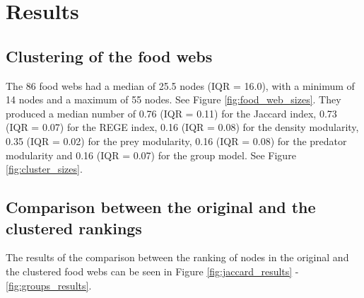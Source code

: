 \section*{Results}

	\subsection*{Clustering of the food webs}

		The 86 food webs had a median of 25.5 nodes (IQR = 16.0), with a minimum of 14 nodes and a maximum of 55 nodes. See Figure \ref{fig:food_web_sizes}. They produced a median number of 0.76 (IQR = 0.11) for the Jaccard index, 0.73 (IQR = 0.07) for the REGE index, 0.16 (IQR = 0.08) for the density modularity, 0.35 (IQR = 0.02) for the prey modularity, 0.16 (IQR = 0.08) for the predator modularity and 0.16 (IQR = 0.07) for the group model. See Figure \ref{fig:cluster_sizes}.

	\subsection*{Comparison between the original and the clustered rankings}

		The results of the comparison between the ranking of nodes in the original and the clustered food webs can be seen in Figure \ref{fig:jaccard_results} - \ref{fig:groups_results}.
